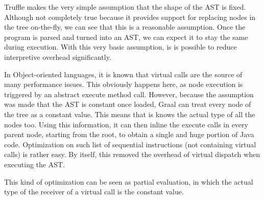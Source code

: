 \documentclass[twoside,11pt,a4paper]{article}
\newcommand{\java}[1]{\textsf{#1}}
\begin{document}
Truffle makes the very simple assumption that the shape of the AST is fixed. Although not completely true because it provides support for replacing nodes in the tree on-the-fly, we can see that this is a reasonable assumption. Once the program is parsed and turned into an AST, we can expect it to stay the same during execution. With this very basic assumption, is is possible to reduce interpretive overhead significantly.

In Object-oriented languages, it is known that virtual calls are the source of many performance issues. This obviously happens here, as node execution is triggered by an abstract \java{execute} method call. However, because the assumption was made that the AST is constant once loaded, Graal can treat every node of the tree as a constant value. This means that is knows the actual type of all the nodes too. Using this information, it can then inline the \java{execute} calls in every parent node, starting from the root, to obtain a single and huge portion of Java code. Optimization on such list of sequential instructions (not containing virtual calls) is rather easy. By itself, this removed the overhead of virtual dispatch when executing the AST.

This kind of optimization can be seen as partial evaluation, in which the actual type of the receiver of a virtual call is the constant value.
\end{document}
